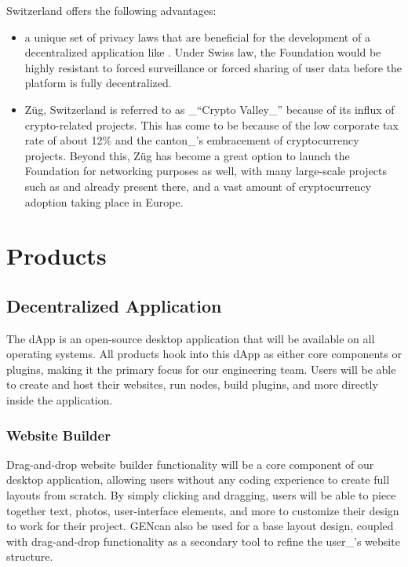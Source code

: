 \documentclass{kwp-builder}
\begin{document}
Switzerland offers the following advantages:

\begin{itemize}
	\item a unique set of privacy laws that are beneficial for the development of a decentralized application like \konjure. Under Swiss law, the \konjure Foundation would be highly resistant to forced surveillance or forced sharing of user data before the platform is fully decentralized.
	
	\item Züg, Switzerland is referred to as \_{“}Crypto Valley\_{”} because of its influx of crypto-related projects. This has come to be because of the low corporate tax rate of about 12\% and the canton\_{’}s embracement of cryptocurrency projects. Beyond this, Züg has become a great option to launch the \konjure Foundation for networking purposes as well, with many large-scale projects such as \cardano and \ethereum already present there, and a vast amount of cryptocurrency adoption taking place in Europe.
\end{itemize}


\section{Products}
\subsection{\konjure Decentralized Application}

\tab The \konjure dApp is an open-source desktop application that will be available on all operating systems. All \konjure products hook into this dApp as either core components or plugins, making it the primary focus for our engineering team. Users will be able to create and host their websites, run nodes, build plugins, and more directly inside the application.

\subsubsection{Website Builder}


\tab Drag-and-drop website builder functionality will be a core component of our desktop application, allowing users without any coding experience to create full layouts from scratch. By simply clicking and dragging, users will be able to piece together text, photos, user-interface elements, and more to customize their design to work for their project. \konjure GEN\kgen can also be used for a base layout design, coupled with drag-and-drop functionality as a secondary tool to refine the user\_{’}s website structure.
\end{document}
